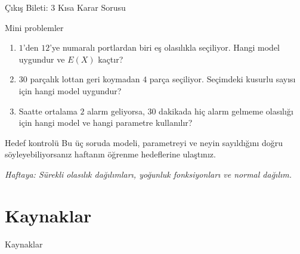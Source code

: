 \documentclass[light]{lutbeamer}
\begin{document}
\begin{frame}{Çıkış Bileti: 3 Kısa Karar Sorusu}
    \small
    \begin{block}{Mini problemler}
        \begin{enumerate}
            \item \(1\)'den \(12\)'ye numaralı portlardan biri eş olasılıkla seçiliyor. Hangi model uygundur ve \(E(X)\) kaçtır?
            \item \(30\) parçalık lottan geri koymadan \(4\) parça seçiliyor. Seçimdeki kusurlu sayısı için hangi model uygundur?
            \item Saatte ortalama \(2\) alarm geliyorsa, \(30\) dakikada hiç alarm gelmeme olasılığı için hangi model ve hangi parametre kullanılır?
        \end{enumerate}
    \end{block}

    \begin{exampleblock}{Hedef kontrolü}
        Bu üç soruda modeli, parametreyi ve neyin sayıldığını doğru söyleyebiliyorsanız haftanın öğrenme hedeflerine ulaştınız.
    \end{exampleblock}

    \vspace{0.3cm}
    \centering
    \textit{Haftaya: Sürekli olasılık dağılımları, yoğunluk fonksiyonları ve normal dağılım.}
\end{frame}

\section{Kaynaklar}
\begin{frame}[allowframebreaks]{Kaynaklar}
    \nocite{*}
    \printbibliography{}
\end{frame}

\appendix
\end{document}
